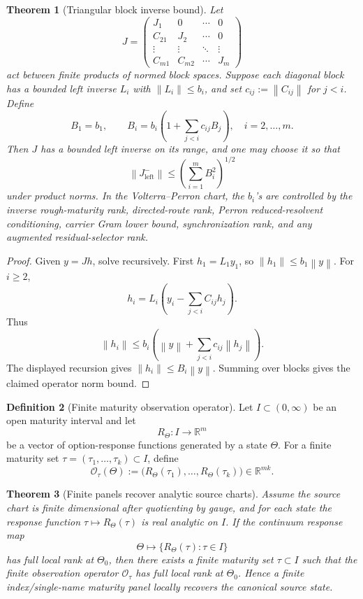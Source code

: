 \documentclass[11pt,a4paper]{amsart}
\theoremstyle{plain}
\newtheorem{theorem}{Theorem}[section]
\theoremstyle{definition}
\newtheorem{definition}[theorem]{Definition}
\theoremstyle{remark}
\newcommand{\R}{\mathbb{R}}
\newcommand{\norm}[1]{\left\lVert #1\right\rVert}
\begin{document}
\begin{theorem}[Triangular block inverse bound]\label{thm:triangular-block-inverse}
Let
\[
        J=
        \begin{pmatrix}
        J_1 & 0 & \cdots & 0\\
        C_{21} & J_2 & \cdots & 0\\
        \vdots & \vdots & \ddots & \vdots\\
        C_{m1} & C_{m2} & \cdots & J_m
        \end{pmatrix}
\]
act between finite products of normed block spaces.  Suppose each diagonal block has a bounded
left inverse \(L_i\) with \(\norm{L_i}\le b_i\), and set \(c_{ij}:=\norm{C_{ij}}\) for
\(j<i\).  Define
\[
        B_1=b_1,\qquad
        B_i=b_i\left(1+\sum_{j<i}c_{ij}B_j\right),\quad i=2,\dots,m.
\]
Then \(J\) has a bounded left inverse on its range, and one may choose it so that
\[
        \norm{J_{\mathrm{left}}^{-}}
        \le
        \left(\sum_{i=1}^mB_i^2\right)^{1/2}
\]
under product norms.  In the Volterra--Perron chart, the \(b_i\)'s are controlled by the inverse
rough-maturity rank, directed-route rank, Perron reduced-resolvent conditioning, carrier Gram
lower bound, synchronization rank, and any augmented residual-selector rank.
\end{theorem}

\begin{proof}
Given \(y=Jh\), solve recursively.  First \(h_1=L_1y_1\), so
\(\norm{h_1}\le b_1\norm y\).  For \(i\ge2\),
\[
        h_i=L_i\left(y_i-\sum_{j<i}C_{ij}h_j\right).
\]
Thus
\[
        \norm{h_i}
        \le
        b_i\left(\norm y+\sum_{j<i}c_{ij}\norm{h_j}\right).
\]
The displayed recursion gives \(\norm{h_i}\le B_i\norm y\).  Summing over blocks gives the
claimed operator norm bound.
\end{proof}

\begin{definition}[Finite maturity observation operator]\label{def:finite-maturity-operator}
Let \(I\subset(0,\infty)\) be an open maturity interval and let
\[
        R_\Theta:I\to\R^m
\]
be a vector of option-response functions generated by a state \(\Theta\).  For a finite maturity
set \(\tau=(\tau_1,\dots,\tau_k)\subset I\), define
\[
        \mathcal O_\tau(\Theta)
        :=
        \bigl(R_\Theta(\tau_1),\dots,R_\Theta(\tau_k)\bigr)\in\R^{mk}.
\]
\end{definition}

\begin{theorem}[Finite panels recover analytic source charts]\label{thm:finite-panel-recovery}
Assume the source chart is finite dimensional after quotienting by gauge, and for each state the
response function \(\tau\mapsto R_\Theta(\tau)\) is real analytic on \(I\).  If the continuum
response map
\[
        \Theta\mapsto \{R_\Theta(\tau):\tau\in I\}
\]
has full local rank at \(\Theta_0\), then there exists a finite maturity set \(\tau\subset I\)
such that the finite observation operator \(\mathcal O_\tau\) has full local rank at
\(\Theta_0\).  Hence a finite index/single-name maturity panel locally recovers the canonical source state.
\end{theorem}
\end{document}
